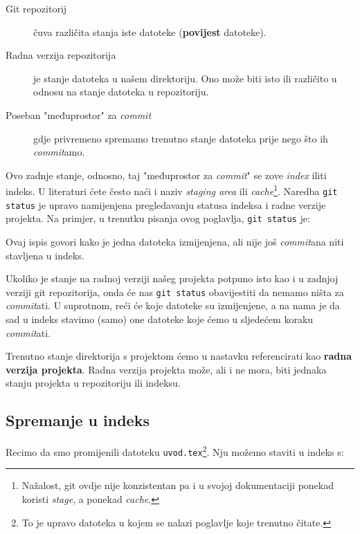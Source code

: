 \begin{description}
	\item[Git repozitorij] čuva različita stanja iste datoteke (\textbf{povijest} datoteke).
	\item[Radna verzija repozitorija] je stanje datoteka u našem direktoriju. Ono može biti isto ili različito u odnosu na stanje datoteka u repozitoriju.
	\item[Poseban "međuprostor" za \emph{commit}] gdje privremeno spremamo trenutno stanje datoteka prije nego što ih \emph{commit}amo.
\end{description}

Ovo zadnje stanje, odnosno, taj "međuprostor za \emph{commit}" se zove \emph{index} iliti indeks.
U literaturi ćete često naći i naziv \emph{staging area} ili \emph{cache}\footnote{Nažalost, git ovdje nije konzistentan pa i u svojoj dokumentaciji ponekad koristi \emph{stage}, a ponekad \emph{cache}.}.
Naredba \verb+git status+ je upravo namijenjena pregledavanju statusa indeksa i radne verzije projekta.
Na primjer, u trenutku pisanja ovog poglavlja, \verb+git status+ je:



Ovaj ispis govori kako je jedna datoteka izmijenjena, ali nije još \emph{commit}ana niti stavljena u indeks.

Ukoliko je stanje na radnoj verziji našeg projekta potpuno isto kao i u zadnjoj verziji git repozitorija, onda će nas \verb+git status+ obavijestiti da nemamo ništa za \emph{commit}ati.
U suprotnom, reći će koje datoteke su izmijenjene, a na nama je da sad u indeks stavimo (samo) one datoteke koje ćemo u sljedećem koraku \emph{commit}ati.

Trenutno stanje direktorija s projektom ćemo u nastavku referencirati kao \textbf{radna verzija projekta}.
Radna verzija projekta može, ali i ne mora, biti jednaka stanju projekta u repozitoriju ili indeksu.

\subsection*{Spremanje u indeks}

Recimo da smo promijenili datoteku \verb+uvod.tex+\footnote{To je upravo datoteka u kojem se nalazi poglavlje koje trenutno čitate.}.
Nju možemo staviti u indeks s:


